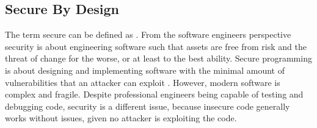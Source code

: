 \subsection{Secure By Design}
The term secure can be defined as . From the software engineers perspective security is about engineering software such that assets are free from risk and the threat of change for the worse, or at least to the best ability. Secure programming is about designing and implementing software with the minimal amount of vulnerabilities that an attacker can exploit \cite{helfrich2019security}. However, modern software is complex and fragile. Despite professional engineers being capable of testing and debugging code, security is a different issue, because insecure code generally works without issues, given no attacker is exploiting the code.



